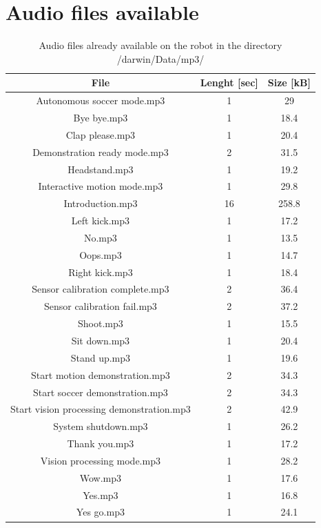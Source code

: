 \documentclass[a4paper, 12pt]{article}  		%
\begin{document}

\section{Audio files available} \label{sec:audioFile}

\begin{table}[H]
\begin{center}
\begin{tabular}{ | c | c | c |  }

\hline
File & Lenght [sec] & Size [kB] \\ 
\hline
\hline
Autonomous soccer mode.mp3 & 1 & 29 \\
\hline
Bye bye.mp3 & 1 & 18.4 \\
\hline
Clap please.mp3 & 1 & 20.4 \\
\hline
Demonstration ready mode.mp3 & 2 & 31.5 \\
\hline
Headstand.mp3 & 1 & 19.2 \\
\hline
Interactive motion mode.mp3 & 1 & 29.8 \\
\hline
Introduction.mp3 & 16 & 258.8 \\
\hline
Left kick.mp3 & 1 & 17.2 \\
\hline
No.mp3 & 1 & 13.5 \\
\hline
Oops.mp3 & 1 & 14.7 \\
\hline
Right kick.mp3 & 1 & 18.4 \\
\hline
Sensor calibration complete.mp3 & 2 & 36.4 \\
\hline
Sensor calibration fail.mp3 & 2 & 37.2 \\
\hline
Shoot.mp3 & 1 & 15.5 \\
\hline
Sit down.mp3 & 1 & 20.4 \\
\hline
Stand up.mp3 & 1 & 19.6 \\
\hline
Start motion demonstration.mp3 & 2 & 34.3 \\
\hline
Start soccer demonstration.mp3 & 2 & 34.3 \\
\hline
Start vision processing demonstration.mp3 & 2 & 42.9 \\
\hline
System shutdown.mp3 & 1 & 26.2 \\
\hline
Thank you.mp3 & 1 & 17.2 \\
\hline
Vision processing mode.mp3 & 1 & 28.2 \\
\hline
Wow.mp3 & 1 & 17.6 \\
\hline
Yes.mp3 & 1 & 16.8 \\
\hline
Yes go.mp3 & 1 & 24.1 \\
\hline
\end{tabular}
\caption{Audio files already available on the robot in the directory /darwin/Data/mp3/}
\label{tab::audioFile}
\end{center}
\end{table}
\end{document}

